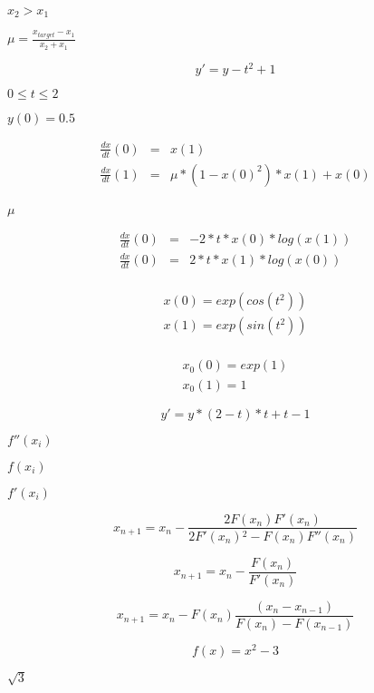 \documentclass{article}
\begin{document}
$ x_{2} > x_{1} $
\pagebreak

$ \mu = \frac{ x_{target} - x_{1} } { x_{2} + x_{1} } $
\pagebreak

\[ y' = y - t^{ 2 } + 1 \]
\pagebreak

$ 0 \leq t \leq 2 $
\pagebreak

$ y( 0 ) = 0.5 $
\pagebreak

\begin{eqnarray*} \frac{ dx }{ dt }( 0 ) &=& x( 1 ) \\ \frac{ dx }{ dt }( 1 ) &=& \mu * ( 1 - x( 0 )^{ 2 } ) * x( 1 ) + x( 0 ) \\ \end{eqnarray*}
\pagebreak

$\mu$
\pagebreak

\begin{eqnarray*} \frac{ dx }{ dt }( 0 ) &=& -2 * t * x( 0 ) * log( x(1) ) \\ \frac{ dx }{ dt }( 0 ) &=& 2 * t * x( 1 ) * log( x(0) ) \\ \end{eqnarray*}
\pagebreak

\begin{eqnarray*} x(0) = exp( cos( t^{2} ) ) \\ x(1) = exp( sin( t^{2} ) ) \\ \end{eqnarray*}
\pagebreak

\begin{eqnarray*} x_{0}(0) = exp(1) \\ x_{0}(1) = 1 \end{eqnarray*}
\pagebreak

\[ y' = y * ( 2 - t ) * t + t - 1 \]
\pagebreak

$f''(x_i)$
\pagebreak

$f(x_i)$
\pagebreak

$f'(x_i)$
\pagebreak

\[ x_{n+1} = x_n-\frac{2 F\left(x_n\right) F'\left(x_n\right)} {2 F'\left(x_n\right){}^2-F\left(x_n\right) F''\left(x_n\right)} \]
\pagebreak

\[ x_{n+1} = x_n - \frac{F\left(x_n\right)}{F'\left(x_n\right)} \]
\pagebreak

\[ x_{n+1} = x_n - F\left(x_n\right) \frac{\left(x_n - x_{n-1}\right)} {F\left(x_n\right) - F\left(x_{n-1}\right)} \]
\pagebreak

\[ f(x) = x^{2} - 3 \]
\pagebreak

$\sqrt{3}$
\pagebreak
\end{document}
